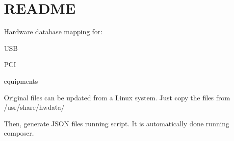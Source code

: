 \chapter{README}
\hypertarget{md_public_2glpi_2vendor_2glpi-project_2inventory__format_2data_2_r_e_a_d_m_e}{}\label{md_public_2glpi_2vendor_2glpi-project_2inventory__format_2data_2_r_e_a_d_m_e}
Hardware database mapping for\+:
\begin{DoxyItemize}
\item USB
\item PCI
\item {} equipments
\end{DoxyItemize}

Original files can be updated from a Linux system. Just copy the files from /usr/share/hwdata/

Then, generate JSON files running  script. It is automatically done running composer. 